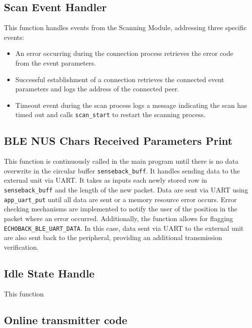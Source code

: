 \documentclass{Configuration_Files/PoliMi3i_thesis}
\begin{document}
\subsection*{Scan Event Handler}
This function handles events from the Scanning Module, addressing three specific events:
\begin{itemize}
    \item An error occurring during the connection process retrieves the error code from the event parameters.
    \item Successful establishment of a connection retrieves the connected event parameters and logs the address of the connected peer.
    \item Timeout event during the scan process logs a message indicating the scan has timed out and calls \texttt{scan\_start} to restart the scanning process.
\end{itemize}

\subsection*{BLE NUS Chars Received Parameters Print}
This function is continuously called in the main program until there is no data overwrite in the circular buffer \texttt{senseback\_buff}. It handles sending data to the external unit via UART. It takes as inputs each newly stored row in \texttt{senseback\_buff} and the length of the new packet. Data are sent via UART using \texttt{app\_uart\_put} until all data are sent or a memory resource error occurs. Error checking mechanisms are implemented to notify the user of the position in the packet where an error occurred. Additionally, the function allows for flagging \texttt{ECHOBACK\_BLE\_UART\_DATA}. In this case, data sent via UART to the external unit are also sent back to the peripheral, providing an additional transmission verification.

\subsection*{Idle State Handle}
This function

\subsection{Online transmitter code}
\end{document}
